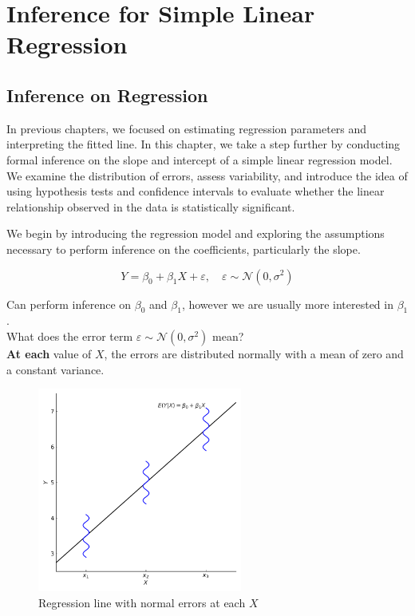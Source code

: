 \setcounter{chapter}{15}
\chapter{Inference for Simple Linear Regression}

\section{Inference on Regression}

In previous chapters, we focused on estimating regression parameters and interpreting the fitted line. In this chapter, we take a step further by conducting formal inference on the slope and intercept of a simple linear regression model. We examine the distribution of errors, assess variability, and introduce the idea of using hypothesis tests and confidence intervals to evaluate whether the linear relationship observed in the data is statistically significant.

\vspace{1em}
We begin by introducing the regression model and exploring the assumptions necessary to perform inference on the coefficients, particularly the slope.

\[
Y = \beta_0 + \beta_1 X + \varepsilon, \quad \varepsilon \sim \mathcal{N}(0, \sigma^2)
\]

Can perform inference on $\beta_0$ and $\beta_1$, however we are usually more interested in $\beta_1$. \\

What does the error term $\varepsilon \sim \mathcal{N}(0, \sigma^2)$ mean? \\
\textbf{At each} value of $X$, the errors are distributed normally with a mean of zero and a constant variance.

\begin{figure}[H]
  \centering
  \includegraphics[width=0.6\textwidth]{section16/images/regression_model.pdf}
  \caption{Regression line with normal errors at each $X$}
\end{figure}

